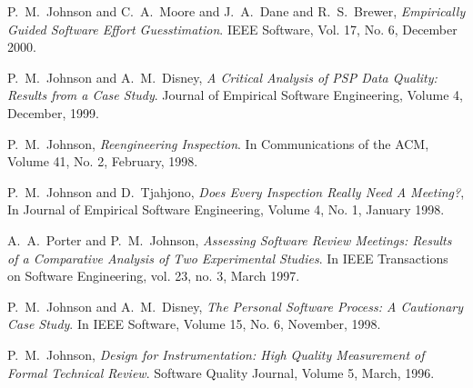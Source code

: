 \begin{Selected Publications}
  
\item P.~M.~Johnson and C.~A.~Moore and J.~A.~Dane and R.~S.~Brewer, {\em
    Empirically Guided Software Effort Guesstimation}.  IEEE Software, Vol.
  17, No. 6, December 2000.
  
\item P.~M.~Johnson and A.~M.~Disney, {\em A Critical Analysis of PSP Data
    Quality: Results from a Case Study}.  Journal of Empirical Software
  Engineering, Volume 4, December, 1999.
  
\item P.~M.~Johnson, {\em Reengineering Inspection}.  In Communications of
  the ACM, Volume 41, No. 2, February, 1998.
  
\item P.~M.~Johnson and D.~Tjahjono, {\em Does Every Inspection Really Need
    A Meeting?}, In Journal of Empirical Software Engineering, Volume 4,
  No. 1, January 1998.
  
\item A.~A.~Porter and P.~M.~Johnson, {\em Assessing Software Review
    Meetings: Results of a Comparative Analysis of Two Experimental
    Studies}.  In IEEE Transactions on Software Engineering, vol. 23, no.
  3, March 1997.
  
\item P.~M.~Johnson and A.~M.~Disney, {\em The Personal Software Process: A
    Cautionary Case Study}.  In IEEE Software, Volume 15, No. 6, November,
  1998.

\item P.~M.~Johnson, {\em Design for Instrumentation: High Quality
    Measurement of Formal Technical Review}.  Software Quality Journal,
  Volume 5, March, 1996.

\end{Selected Publications}

